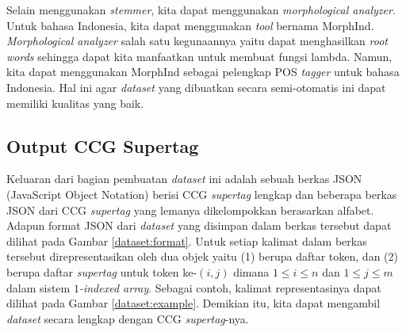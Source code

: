 Selain menggunakan \textit{stemmer}, kita dapat menggunakan \textit{morphological analyzer}.
Untuk bahasa Indonesia, kita dapat menggunakan \textit{tool} bernama MorphInd\footnotemark[3].
\textit{Morphological analyzer} salah satu kegunaannya yaitu dapat menghasilkan \textit{root words}
sehingga dapat kita manfaatkan untuk membuat fungsi lambda.
Namun, kita dapat menggunakan MorphInd sebagai pelengkap POS \textit{tagger} untuk bahasa Indonesia.
Hal ini agar \textit{dataset} yang dibuatkan secara semi-otomatis ini dapat memiliki kualitas yang
baik.


\subsection{Output CCG Supertag}

Keluaran dari bagian pembuatan \textit{dataset} ini adalah sebuah berkas JSON
(JavaScript Object Notation) berisi CCG \textit{supertag} lengkap dan beberapa berkas JSON dari CCG
\textit{supertag} yang lemanya dikelompokkan berasarkan alfabet.
Adapun format JSON dari \textit{dataset} yang disimpan dalam berkas tersebut dapat dilihat pada Gambar
\ref{dataset:format}.
Untuk setiap kalimat dalam berkas tersebut direpresentasikan oleh dua objek yaitu
(1)  berupa daftar token, dan
(2)  berupa daftar \textit{supertag} untuk token ke-$(i, j)$ dimana $1 \leq i \leq n$
dan $1 \leq j \leq m$ dalam sistem \textit{$1$-indexed array}.
Sebagai contoh, kalimat  representasinya dapat dilihat pada Gambar
\ref{dataset:example}.
Demikian itu, kita dapat mengambil \textit{dataset} secara lengkap dengan CCG \textit{supertag}-nya.

